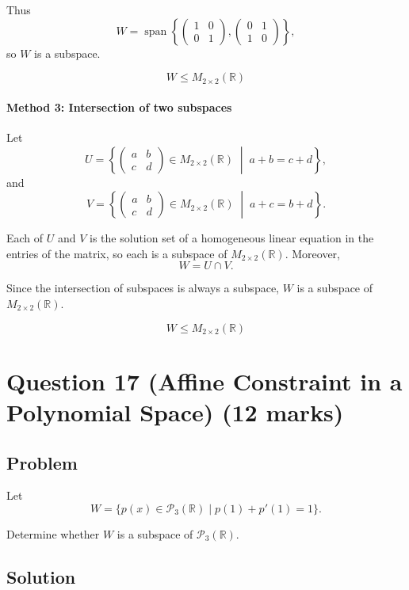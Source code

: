 \documentclass[12pt]{article}
\newcommand{\Span}{\operatorname{span}}
\begin{document}
Thus
\[
W=\Span\left\{
\begin{pmatrix}
1&0\\ 0&1
\end{pmatrix},
\begin{pmatrix}
0&1\\ 1&0
\end{pmatrix}
\right\},
\]
so \(W\) is a subspace.

\[
\boxed{W\le M_{2\times2}(\mathbb R)}
\]

\paragraph{Method 3: Intersection of two subspaces}

Let
\[
U=\left\{
\begin{pmatrix}
a&b\\ c&d
\end{pmatrix}
\in M_{2\times2}(\mathbb R)
\;\middle|\;
a+b=c+d
\right\},
\]
and
\[
V=\left\{
\begin{pmatrix}
a&b\\ c&d
\end{pmatrix}
\in M_{2\times2}(\mathbb R)
\;\middle|\;
a+c=b+d
\right\}.
\]

Each of \(U\) and \(V\) is the solution set of a homogeneous linear equation in the entries of the matrix, so each is a subspace of \(M_{2\times2}(\mathbb R)\). Moreover,
\[
W=U\cap V.
\]

Since the intersection of subspaces is always a subspace, \(W\) is a subspace of \(M_{2\times2}(\mathbb R)\).

\[
\boxed{W\le M_{2\times2}(\mathbb R)}
\]

\newpage
\section{Question 17 (Affine Constraint in a Polynomial Space) \hfill (12 marks)}
\subsection{Problem}

Let
\[
W=\{p(x)\in\mathcal P_3(\mathbb R)\mid p(1)+p'(1)=1\}.
\]

Determine whether \(W\) is a subspace of \(\mathcal P_3(\mathbb R)\).

\subsection{Solution}
\end{document}
